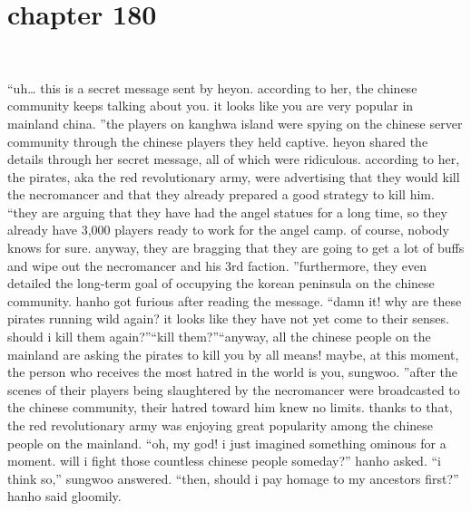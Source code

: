 \section{chapter 180}

                             




“uh… this is a secret message sent by heyon.
 according to her, the chinese community keeps talking about you.
 it looks like you are very popular in mainland china.
”the players on kanghwa island were spying on the chinese server community through the chinese players they held captive.
heyon shared the details through her secret message, all of which were ridiculous.
according to her, the pirates, aka the red revolutionary army, were advertising that they would kill the necromancer and that they already prepared a good strategy to kill him.
“they are arguing that they have had the angel statues for a long time, so they already have 3,000 players ready to work for the angel camp.
 of course, nobody knows for sure.
 anyway, they are bragging that they are going to get a lot of buffs and wipe out the necromancer and his 3rd faction.
”furthermore, they even detailed the long-term goal of occupying the korean peninsula on the chinese community.
hanho got furious after reading the message.
“damn it! why are these pirates running wild again? it looks like they have not yet come to their senses.
 should i kill them again?”“kill them?”“anyway, all the chinese people on the mainland are asking the pirates to kill you by all means! maybe, at this moment, the person who receives the most hatred in the world is you, sungwoo.
”after the scenes of their players being slaughtered by the necromancer were broadcasted to the chinese community, their hatred toward him knew no limits.
thanks to that, the red revolutionary army was enjoying great popularity among the chinese people on the mainland.
“oh, my god! i just imagined something ominous for a moment.
 will i fight those countless chinese people someday?” hanho asked.
“i think so,” sungwoo answered.
“then, should i pay homage to my ancestors first?” hanho said gloomily.

